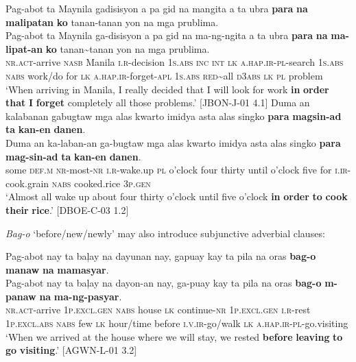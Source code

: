 \ea
\label{bkm:Ref115100950}
Pag-abot  ta  Maynila  gadisisyon  a  pa  gid  na mangita  a  ta  ubra  \textbf{para}  \textbf{na}  \textbf{malipatan} \textbf{ko}  tanan-tanan  yon  na  mga  prublima. \smallskip\\
\gll Pag-abot  ta  Maynila  ga-disisyon  a  pa  gid  na ma-ng-ngita  a  ta  ubra  \textbf{para}  \textbf{na}  \textbf{ma-lipat-an} \textbf{ko}  tanan\sim{}tanan  yon  na  mga  prublima. \\
\textsc{nr.act}-arrive  \textsc{nasb}  Manila  \textsc{i.r}-decision  1\textsc{s.abs}  \textsc{inc}  \textsc{int}  \textsc{lk}
\textsc{a.hap.ir}-\textsc{pl}-search  1\textsc{s.abs}  \textsc{nabs}  work/do  for  \textsc{lk}  \textsc{a.hap.ir}-forget-\textsc{apl}
1\textsc{s.abs}  \textsc{red}\sim{}all  \textsc{d3abs}  \textsc{lk}  \textsc{pl}  problem \\
\glt `When arriving in Manila, I really decided that I will look for work \textbf{in} \textbf{order} \textbf{that} \textbf{I} \textbf{forget} completely all those problems.’ [JBON-J-01 4.1]
\z
\ea
\label{bkm:Ref115100953}
Duma  an  kalabanan  gabugtaw  mga  alas  kwarto  imidya asta  alas  singko  \textbf{para}  \textbf{magsin-ad}  \textbf{ta}  \textbf{kan-en}  \textbf{danen}. \smallskip\\
\gll Duma  an  ka-laban-an  ga-bugtaw  mga  alas  kwarto  imidya asta  alas  singko  \textbf{para}  \textbf{mag-sin-ad}  \textbf{ta}  \textbf{kan-en}  \textbf{danen}. \\
some  \textsc{def.m}  \textsc{nr}-most-\textsc{nr}  \textsc{i.r}-wake.up  \textsc{pl}  o’clock  four  thirty
until  o’clock  five  for  \textsc{i.ir}-cook.grain  \textsc{nabs}  cooked.rice  3\textsc{p.gen} \\
\glt `Almost all wake up about four thirty o’clock until five o’clock \textbf{in} \textbf{order} \textbf{to} \textbf{cook} \textbf{their} \textbf{rice}.’ [DBOE-C-03 1.2]
\z

\textit{Bag-o} ‘before/new/newly’ may also introduce subjunctive adverbial clauses:

\ea
\label{ex:govisiting}
Pag-abot  nay  ta  baļay  na  dayunan  nay,  gapuay kay  ta  pila  na  oras  \textbf{bag-o}  \textbf{manaw}  \textbf{na} \textbf{mamasyar}. \smallskip\\
\gll Pag-abot  nay  ta  baļay  na  dayon-an  nay,  ga-puay kay  ta  pila  na  oras  \textbf{bag-o}  \textbf{m-panaw}  \textbf{na} \textbf{ma-ng-pasyar}. \\
\textsc{nr.act}-arrive  1\textsc{p.excl.gen}  \textsc{nabs}  house  \textsc{lk}  continue-\textsc{nr}  1\textsc{p.excl.gen}  \textsc{i.r}-rest
1\textsc{p.excl.abs}  \textsc{nabs}  few  \textsc{lk}  hour/time  before  \textsc{i.v.ir}-go/walk  \textsc{lk}
\textsc{a.hap.ir-pl}-go.visiting \\
\glt `When we arrived at the house where we will stay, we rested \textbf{before} \textbf{leaving} \textbf{to} \textbf{go} \textbf{visiting}.’ [AGWN-L-01 3.2]
\z

